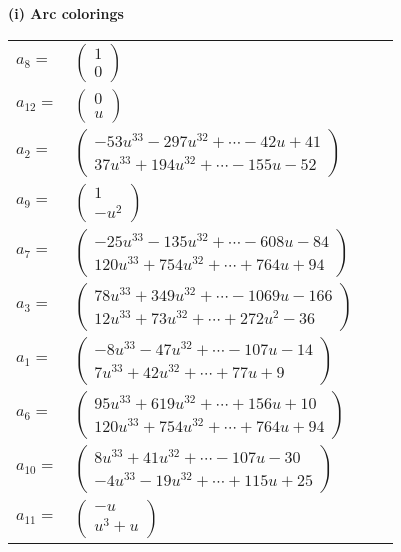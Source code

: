\documentclass[1p]{elsarticle_modified}
\theoremstyle{definition}
\begin{document}
\flushleft \textbf{(i) Arc colorings}\\
\begin{tabular}{m{7pt} m{180pt} m{7pt} m{180pt} }
\flushright $a_{8}=$&$\begin{pmatrix}1\\0\end{pmatrix}$ \\
\flushright $a_{12}=$&$\begin{pmatrix}0\\u\end{pmatrix}$ \\
\flushright $a_{2}=$&$\begin{pmatrix}-53 u^{33}-297 u^{32}+\cdots-42 u+41\\37 u^{33}+194 u^{32}+\cdots-155 u-52\end{pmatrix}$ \\
\flushright $a_{9}=$&$\begin{pmatrix}1\\- u^2\end{pmatrix}$ \\
\flushright $a_{7}=$&$\begin{pmatrix}-25 u^{33}-135 u^{32}+\cdots-608 u-84\\120 u^{33}+754 u^{32}+\cdots+764 u+94\end{pmatrix}$ \\
\flushright $a_{3}=$&$\begin{pmatrix}78 u^{33}+349 u^{32}+\cdots-1069 u-166\\12 u^{33}+73 u^{32}+\cdots+272 u^2-36\end{pmatrix}$ \\
\flushright $a_{1}=$&$\begin{pmatrix}-8 u^{33}-47 u^{32}+\cdots-107 u-14\\7 u^{33}+42 u^{32}+\cdots+77 u+9\end{pmatrix}$ \\
\flushright $a_{6}=$&$\begin{pmatrix}95 u^{33}+619 u^{32}+\cdots+156 u+10\\120 u^{33}+754 u^{32}+\cdots+764 u+94\end{pmatrix}$ \\
\flushright $a_{10}=$&$\begin{pmatrix}8 u^{33}+41 u^{32}+\cdots-107 u-30\\-4 u^{33}-19 u^{32}+\cdots+115 u+25\end{pmatrix}$ \\
\flushright $a_{11}=$&$\begin{pmatrix}- u\\u^3+u\end{pmatrix}$ \\

\end{tabular}
\end{document}
